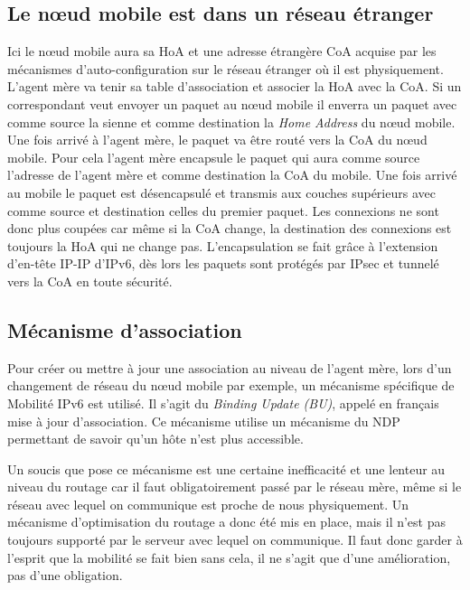 
\subsection{Le nœud mobile est dans un réseau étranger}

Ici le nœud mobile aura sa HoA et une adresse étrangère CoA acquise par les mécanismes d’auto-configuration sur le réseau étranger où il est physiquement.
L’agent mère va tenir sa table d’association et associer la HoA avec la CoA.
Si un correspondant veut envoyer un paquet au nœud mobile il enverra un paquet avec comme source la sienne et comme destination la \emph{Home Address} du nœud mobile.
Une fois arrivé à l’agent mère, le paquet va être routé vers la CoA du nœud mobile.
Pour cela l’agent mère encapsule le paquet qui aura comme source l’adresse de l’agent mère et comme destination la CoA du mobile.
Une fois arrivé au mobile le paquet est désencapsulé et transmis aux couches supérieurs avec comme source et destination celles du premier paquet.
Les connexions ne sont donc plus coupées car même si la CoA change, la destination des connexions est toujours la HoA qui ne change pas.
L’encapsulation se fait grâce à l’extension d’en-tête IP-IP d’IPv6, dès lors les paquets sont protégés par IPsec et tunnelé vers la CoA en toute sécurité.


\subsection{Mécanisme d’association}

Pour créer ou mettre à jour une association au niveau de l’agent mère, lors d’un changement de réseau du nœud mobile par exemple, un mécanisme spécifique de Mobilité IPv6 est utilisé.
Il s’agit du \emph{Binding Update (BU)}, appelé en français mise à jour d’association.
Ce mécanisme utilise un mécanisme du NDP permettant de savoir qu’un hôte n’est plus accessible.


Un soucis que pose ce mécanisme est une certaine inefficacité et une lenteur au niveau du routage car il faut obligatoirement passé par le réseau mère, même si le réseau avec lequel on communique est proche de nous physiquement.
Un mécanisme d’optimisation du routage a donc été mis en place, mais il n’est pas toujours supporté par le serveur avec lequel on communique.
Il faut donc garder à l’esprit que la mobilité se fait bien sans cela, il ne s’agit que d’une amélioration, pas d’une obligation.

